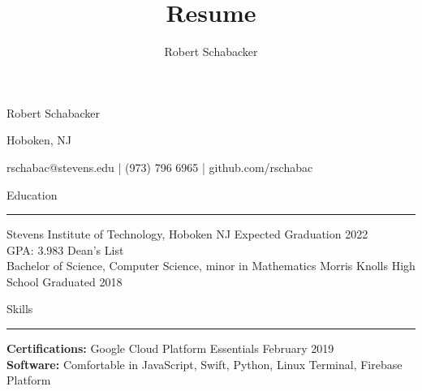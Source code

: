 \documentclass{article}
\title{Resume}
\author{Robert Schabacker}
\newcommand \spacingBetweenHeadings {0.4em}
\begin{document}
\begin{center}
{\Huge Robert Schabacker\par}
{\Large Hoboken, NJ\par}
{\Large rschabac@stevens.edu  |  (973) 796 6965  |  github.com/rschabac\par}
\end{center}
\vspace{0.7em}
\vspace{\spacingBetweenHeadings}

\noindent
\huge Education\par
\vspace{0.1em}
\hrule
\Large
\vspace{1em}
\noindent
Stevens Institute of Technology, Hoboken NJ
\hfill
Expected Graduation 2022\\
GPA: 3.983 \hspace{0.7cm} Dean's List\\
Bachelor of Science, Computer Science, minor in Mathematics
\vspace{1em}
\newline
Morris Knolls High School
\hfill
Graduated 2018\\
\vspace{0.8em}

\noindent
\huge Skills\par
\vspace{0.1em}
\hrule
\Large
\vspace{1em}
\noindent
\textbf{Certifications:} Google Cloud Platform Essentials
\hfill
February 2019\\
\textbf{Software:} Comfortable in JavaScript, Swift, Python, Linux Terminal, Firebase Platform\\
\vspace{\spacingBetweenHeadings}
\end{document}

